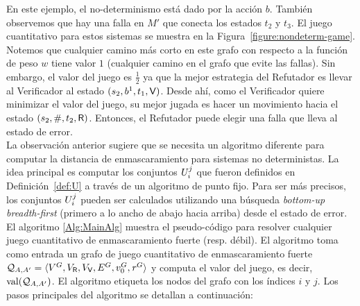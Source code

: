 En este ejemplo, el no-determinismo está dado por la acción $b$. También observemos que hay una falla en $M'$ que conecta los estados $t_2$ y $t_3$. El juego cuantitativo para estos sistemas se muestra en la Figura~\ref{figure:nondeterm-game}. Notemos que cualquier camino más corto en este grafo con respecto a la función de peso $w$ tiene valor $1$ (cualquier camino en el grafo que evite las fallas). Sin embargo, el valor del juego es $\frac{1}{2}$ ya que la mejor estrategia del Refutador es llevar al Verificador al estado $(s_2,b^1,t_1,\mathsf{V})$. 
Desde ahí, como el Verificador quiere minimizar el valor del juego, su mejor jugada es hacer un movimiento hacia el estado $(s_2,\#,t_2,\mathsf{R})$. Entonces, el Refutador puede elegir una falla que lleva al estado de error. \\

La observación anterior sugiere que se necesita un algoritmo diferente para computar la distancia de enmascaramiento para sistemas no deterministas. 
La idea principal es computar los conjuntos $U^j_i$ que fueron definidos en Definición~\ref{def:U} a través de un algoritmo de punto fijo. Para ser más precisos, los conjuntos $U^j_i$ pueden ser calculados utilizando una búsqueda \textit{bottom-up breadth-first} (primero a lo ancho de abajo hacia arriba) desde el estado de error. 
El algoritmo \ref{Alg:MainAlg} muestra el pseudo-código para resolver cualquier juego cuantitativo de enmascaramiento fuerte (resp. débil). 
El algoritmo toma como entrada un grafo de juego cuantitativo de enmascaramiento fuerte  $\mathcal{Q}_{A, A'} = \langle V^G, V_{\mathsf{R}}, V_{\mathsf{V}},E^G, v_0^G, \mathit{r}^G \rangle$ 
y computa el valor del juego, es decir, $\mathop{\textup{val}}(\mathcal{Q}_{A, A'})$.
El algoritmo etiqueta los nodos del grafo con los índices $i$ y $j$. 
Los pasos principales del algoritmo se detallan a continuación:


